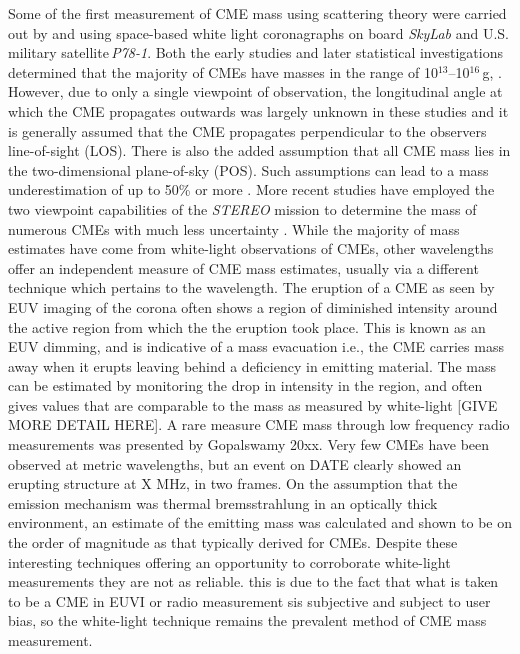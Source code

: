 Some of the first measurement of CME mass using scattering theory were carried out by \citet{munro1979} and \citet{poland1981} using space-based  white light coronagraphs on board \emph{SkyLab} and U.S. military satellite\,\emph{P78-1}.  Both the early studies and later statistical investigations determined that the majority of CMEs have masses in the range of 10$^{13}$--10$^{16}$\,g, \citep{vourlidas02, vour2010}. However, due to only a single viewpoint of observation, the longitudinal angle at which the CME propagates outwards was largely unknown in these studies and it is generally assumed that the CME propagates perpendicular to the observers line-of-sight (LOS). There is also the added assumption that all CME mass lies in the two-dimensional plane-of-sky (POS). Such assumptions can lead to a mass underestimation of up to 50\% or more \citep{vou00}. More recent studies have employed the two viewpoint capabilities of the \emph{STEREO} mission to determine the mass of numerous CMEs with much less uncertainty \citep{cola09}. While the majority of mass estimates have come from white-light observations of CMEs, other wavelengths offer an independent measure of CME mass estimates, usually via a different technique which pertains to the wavelength. The eruption of a CME as seen by EUV imaging of the corona often shows a region of diminished intensity around the active region from which the the eruption took place. This is known as an EUV dimming, and is indicative of a mass evacuation i.e., the CME carries mass away when it erupts leaving behind a deficiency in emitting material. The mass can be estimated by monitoring the drop in intensity in the region, and often gives values that are comparable to the mass as measured by white-light [GIVE MORE DETAIL HERE]\citep{aschw09}. A rare measure CME mass through low frequency radio measurements was presented by Gopalswamy 20xx. Very few CMEs have been observed at metric wavelengths, but an event on DATE clearly showed an erupting structure at X MHz, in two frames. On the assumption that the emission mechanism was thermal bremsstrahlung in an optically thick environment, an estimate of the emitting mass was calculated and shown to be on the order of magnitude as that typically derived for CMEs. Despite these interesting techniques offering an opportunity to corroborate white-light measurements they are not as reliable. this is due to the fact that what is taken to be a CME in EUVI or radio measurement sis subjective and subject to user bias, so the white-light technique remains the prevalent method of CME mass measurement.

